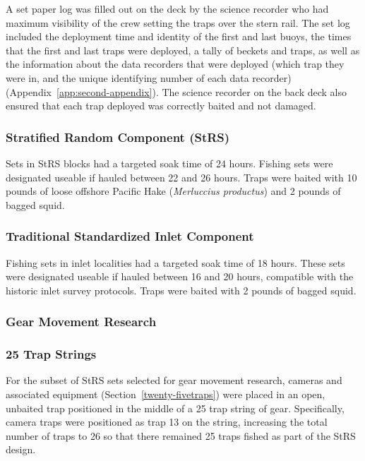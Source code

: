 \documentclass[12pt]{article}\usepackage[]{graphicx}\usepackage[]{color}
\begin{document}
A set paper log was filled out on the deck by the science recorder who had maximum visibility of the crew setting the traps over the stern rail. The set log included the deployment time and identity of the first and last buoys, the times that the first and last traps were deployed, a tally of beckets and traps, as well as the information about the data recorders that were deployed (which trap they were in, and the unique identifying number of each data recorder) (Appendix~\ref{app:second-appendix}). The science recorder on the back deck also ensured that each trap deployed was correctly baited and not damaged.

\hypertarget{stratified-random-component-strs}{%
\subsubsection{Stratified Random Component (StRS)}\label{stratified-random-component-strs}}

Sets in StRS blocks had a targeted soak time of 24 hours. Fishing sets were designated useable if hauled between 22 and 26 hours. Traps were baited with 10 pounds of loose offshore Pacific Hake (\emph{Merluccius productus}) and 2 pounds of bagged squid.

\hypertarget{traditional-standardized-inlet-component}{%
\subsubsection{Traditional Standardized Inlet Component}\label{traditional-standardized-inlet-component}}

Fishing sets in inlet localities had a targeted soak time of 18 hours. These sets were designated useable if hauled between 16 and 20 hours, compatible with the historic inlet survey protocols. Traps were baited with 2 pounds of bagged squid.

\hypertarget{gear-movement-research}{%
\subsubsection{Gear Movement Research}\label{gear-movement-research}}

\hypertarget{trap-strings}{%
\subsubsection{25 Trap Strings}\label{trap-strings}}

For the subset of StRS sets selected for gear movement research, cameras and associated equipment (Section~\ref{twenty-fivetraps}) were placed in an open, unbaited trap positioned in the middle of a 25 trap string of gear. Specifically, camera traps were positioned as trap 13 on the string, increasing the total number of traps to 26 so that there remained 25 traps fished as part of the StRS design.
\end{document}
